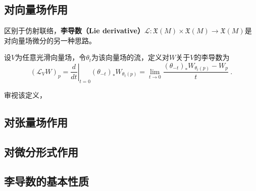 \subsection{对向量场作用}
区别于仿射联络，\textbf{李导数（Lie derivative）}$\mathcal{L}:\mathfrak{X}(M)\times\mathfrak{X}(M)\to\mathfrak{X}(M)$是对向量场微分的另一种思路。

\begin{definition}{}
设$V$为任意光滑向量场，令$\theta_t$为该向量场的流，定义对$W$关于$V$的李导数为
\begin{equation}(\mathcal{L}_VW)_p=\left.\frac{d}{dt}\right|_{t=0}(\theta_{-t})_*W_{\theta_t(p)}=\lim_{t\to0}\frac{(\theta_{-t})_*W_{\theta_t(p)}-W_p}{t}~.\end{equation}
\end{definition}
审视该定义，

\subsection{对张量场作用}
\subsection{对微分形式作用}
\subsection{李导数的基本性质}